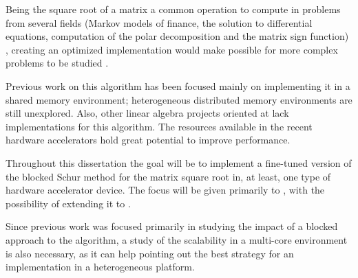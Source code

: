 Being the square root of a matrix a common operation to compute in problems from several fields (Markov models of finance, the solution to differential equations, computation of the polar decomposition and the matrix sign function) \cite{Higham:2008:FM}, creating an optimized implementation would make possible for more complex problems to be studied \cite{Hill:Marty:2008}.

Previous work on this algorithm has been focused mainly on implementing it in a \cpu shared memory environment; heterogeneous distributed memory environments are still unexplored. Also, other linear algebra projects oriented at \gpus lack implementations for this algorithm. The resources available in the recent hardware accelerators hold great potential to improve performance.

Throughout this dissertation the goal will be to implement a fine-tuned version of the blocked Schur method for the matrix square root in, at least, one type of hardware accelerator device. The focus will be given primarily to \gpus, with the possibility of extending it to \mics.

Since previous work was focused primarily in studying the impact of a blocked approach to the algorithm, a study of the scalability in a multi-core environment is also necessary, as it can help pointing out the best strategy for an implementation in a heterogeneous platform.
